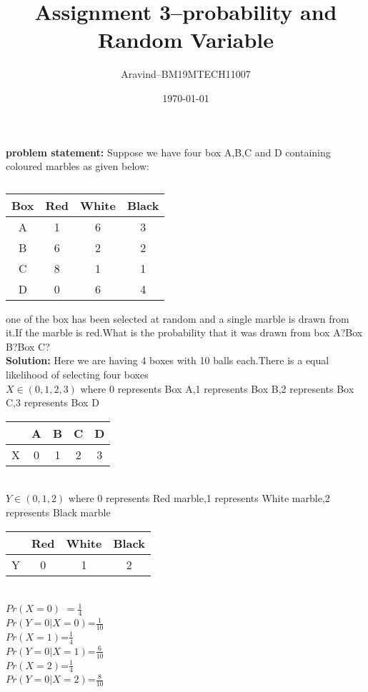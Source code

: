 \documentclass[11pt,a4paper,twocolumn]{article}
\title{\textbf{Assignment 3--probability and Random Variable}}
\author{Aravind--BM19MTECH11007}
\date{\today}
\begin{document}
\maketitle
\textbf{problem statement:} Suppose we have four box A,B,C and D containing coloured marbles as given below:
\begin{table}[h]
\centering
\caption{}

\begin{tabular}{|c|c|c|c|}
\hline
Box & Red & White & Black\\
\hline
A & 1&6&3\\
B&6&2&2\\
C&8&1&1\\
D&0&6&4\\
\hline
\end{tabular}
\end{table}
one of the box has been selected at random and a single marble is drawn from it.If the marble is red.What is the probability that it was drawn from box A?Box B?Box C?
\\
\textbf{Solution:}
Here we are having 4 boxes with 10 balls each.There is a equal likelihood of selecting  four boxes\\
$X\in(0,1,2,3)$ where 0 represents Box A,1 represents Box B,2 represents Box C,3 represents Box D\\[5pt]
\begin{tabular}{|c|c|c|c|c|}
\hline
     &A&B&C&D  \\
     \hline
     X&0&1&2&3\\
     \hline
\end{tabular}\\[5pt]
$Y\in(0,1,2)$ where 0 represents Red marble,1 represents White marble,2 represents Black marble\\[5pt]
\begin{tabular}{|c|c|c|c|}
\hline
     &Red&White&Black  \\
     \hline
     Y&0&1&2\\
     \hline
\end{tabular}\\[5pt]
$Pr(X\!=\!0)$ $=\frac{1}{4}$
\\
$Pr(Y\!=\!0|X\!=\!0)$=$\frac{1}{10}$\\
$Pr(X\!=\!1)$=$\frac{1}{4}$
\\$Pr(Y\!=\!0|X\!=\!1)$=$\frac{6}{10}$\\
$Pr(X\!=\!2)$=$\frac{1}{4}$
\\$Pr(Y\!=\!0|X\!=\!2)$=$\frac{8}{10}$\\
\end{document}
